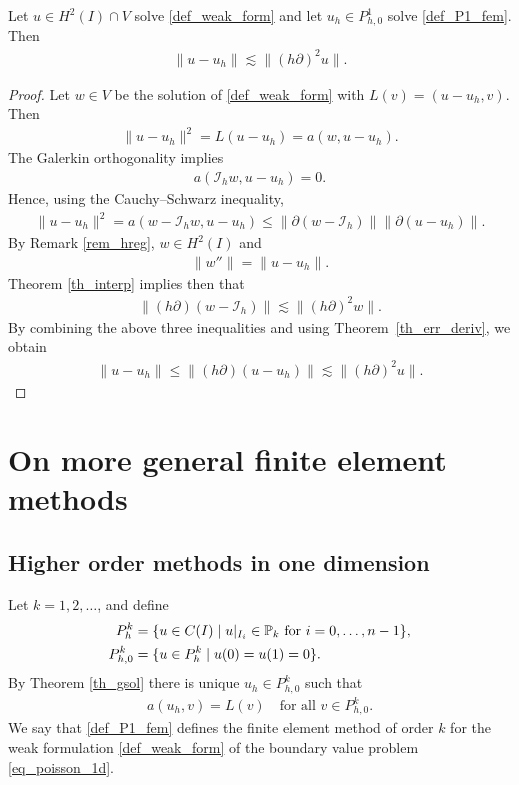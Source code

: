 \documentclass[12pt,oneside]{amsart}
\def\p{\partial}
\def\I{\mathcal I}
\begin{document}
\begin{theorem}\label{th_err}
Let $u \in H^2(I) \cap V$ solve \eqref{def_weak_form}
and let $u_h \in P_{h,0}^1$ solve \eqref{def_P1_fem}.
Then
    \begin{align*}
\|u-u_h\|
\lesssim
\|(h \partial)^2 u\|.
    \end{align*}
\end{theorem}
\begin{proof}
Let $w \in V$ be the solution of \eqref{def_weak_form} with $L(v) = (u - u_h,v)$. Then 
    \begin{align*}
\|u-u_h\|^2 = L(u - u_h) = a(w, u - u_h).
    \end{align*}
The Galerkin orthogonality implies
    \begin{align*}
a(\I_h w, u - u_h) = 0.
    \end{align*}
Hence, using the Cauchy--Schwarz inequality,
    \begin{align*}
\|u-u_h\|^2 
= 
a(w - \I_h w, u - u_h) 
\le 
\|\p(w - \I_h)\|\|\p(u-u_h)\|.
    \end{align*}
By Remark \ref{rem_hreg}, $w \in H^2(I)$ and 
    \begin{align*}
\|w''\| = \|u - u_h\|.
    \end{align*}
Theorem \ref{th_interp} implies then that 
    \begin{align*}
\|(h\p)(w - \I_h)\| \lesssim \|(h\p)^2 w\|.
    \end{align*}
By combining the above three inequalities and using Theorem~\ref{th_err_deriv}, we obtain
    \begin{align*}
\|u-u_h\| 
\le 
\|(h\p)(u-u_h)\| 
\lesssim
\|(h \partial)^2 u\|.
    \end{align*}
\end{proof}

\section{On more general finite element methods}

\subsection{Higher order methods in one dimension}

Let $k=1,2,\dots$, and define 
    \begin{align*}
P^k_{h} &= \{ u \in C(I) \mid \text{$u|_{I_{i}} \in \mathbb P_k$ for $i=0,\dots,n-1$} \},
\\\notag
P^k_{h,0} &= \{ u \in P^k_{h} \mid u(0) = u(1) = 0 \}.
    \end{align*} 
By Theorem \ref{th_gsol} there is unique $u_h \in P_{h,0}^k$ such that 
    \begin{align}\label{def_Pk_fem}
a(u_h,v) = L(v) \quad \text{for all $v \in P_{h,0}^k$}.
    \end{align}
We say that \eqref{def_P1_fem} defines the finite element method of order $k$ for the weak formulation \eqref{def_weak_form}
of the boundary value problem \eqref{eq_poisson_1d}.
\end{document}
